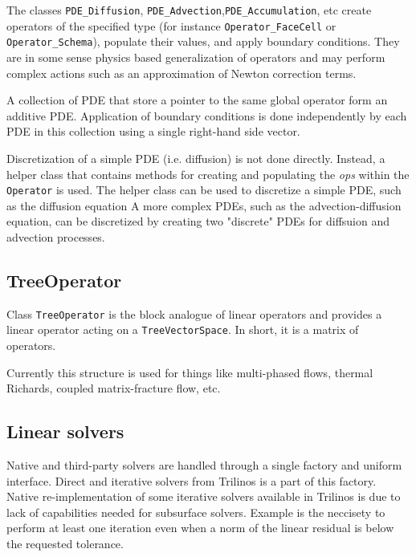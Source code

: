 {The classes {\tt PDE\_Diffusion}, {\tt PDE\_Advection},{\tt PDE\_Accumulation}, etc create 
operators of the specified type (for instance 
{\tt Operator\_FaceCell} or {\tt Operator\_Schema}), populate their values, and
apply boundary conditions.
They are in some sense physics based generalization of operators and may perform complex actions
such as an approximation of Newton correction terms.

A collection of PDE that store a pointer to the same global operator form an additive PDE.
Application of boundary conditions is done independently by each PDE in this collection 
using a single right-hand side vector.


Discretization of a simple 
PDE (i.e. diffusion) is not done directly. 
Instead, a helper class that contains methods for creating and populating 
the {\it ops} within the {\tt Operator} is used. 
The helper class can be used to discretize a simple PDE, such as the diffusion equation
A more complex PDEs, such as the advection-diffusion equation, can be discretized 
by creating two "discrete" PDEs for diffsuion and advection processes.


\subsection{TreeOperator}
Class {\tt TreeOperator} is the block analogue of linear operators and 
provides a linear operator acting on a {\tt TreeVectorSpace}. 
In short, it is a matrix of operators.

Currently this structure is used for things like multi-phased flows, 
thermal Richards, coupled matrix-fracture flow, etc.


\subsection{Linear solvers}
Native and third-party solvers are handled through a single factory and 
uniform interface.
Direct and iterative solvers from Trilinos is a part of this factory.
Native re-implementation of some iterative solvers available in Trilinos
is due to lack of capabilities needed for subsurface solvers.
Example is the neccisety to perform at least one iteration even when
a norm of the linear residual is below the requested tolerance.


}
